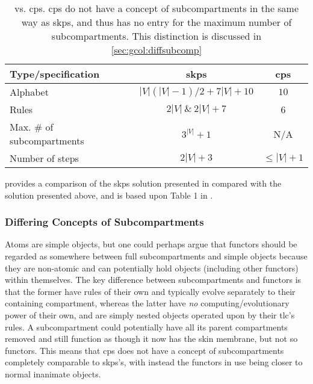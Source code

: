 \begin{table}
\centering
\begin{tabular}{@{}lcc@{}}
\toprule
Type/specification                & \gls{skps}        & \gls{cps} \\ \midrule
Alphabet                          & \(|V|(|V|-1)/2 + 7|V| + 10\) & \(10\)         \\
Rules                             & \(2|V|~\&~2|V| + 7\)       & 6          \\
Max. \# of subcompartments & \(3^|V| + 1\)             & N/A          \\
Number of steps                   & \(2|V| + 3\)             & \(\leq |V| + 1\)         \\ \bottomrule
\end{tabular}%
\caption{ vs. \gls{cps}.  \gls{cps} do not have a concept of subcompartments in the same way as \gls{skps}, and thus has no entry for the maximum number of subcompartments.  This distinction is discussed in \cref{sec:gcol:diffsubcomp}}
\label{tab:gcol:skpcomp}
\end{table}


 provides a comparison of the \gls{skps} solution presented in \cite{Gheorghe2013} compared with the solution presented above, and is based upon Table 1 in \cite{Gheorghe2013}.  

\subsubsection{\label{sec:gcol:diffsubcomp}Differing Concepts of Subcompartments}
Atoms are simple objects, but one could perhaps argue that functors should be regarded as somewhere between full subcompartments and simple objects because they are non-atomic and can potentially hold objects (including other functors) within themselves.  The key difference between subcompartments and functors is that the former have rules of their own and typically evolve separately to their containing \gls{compartment}, whereas the latter have \emph{no} computing/evolutionary power of their own, and are simply nested objects operated upon by their \gls{tlc}'s rules.  A subcompartment could potentially have all its parent \glspl{compartment} removed and still function as though it now has the skin membrane, but not so functors.  This means that \gls{cps} does not have a concept of subcompartments completely comparable to \gls{skps}'s, with instead the functors in use being closer to normal inanimate objects.

